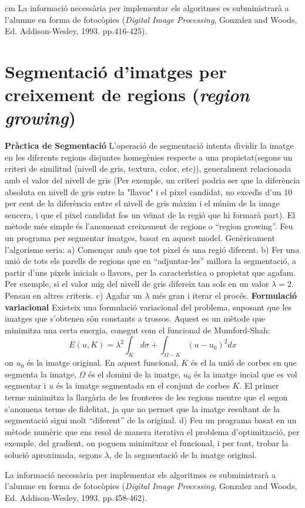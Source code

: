 \documentclass{article}
\begin{document}
 cm
La informaci\'o necess\`aria per implementar els algoritmes
es subministrar\`a a l'alumne en forma de fotoc\`opies 
({\it Digital Image Processing}, Gonzalez and Woods, Ed. Addison-Wesley, 1993. pp.416-425).

\section{Segmentaci\'o d'imatges per creixement de regions ({\it region growing})}
\noindent
{\bf Pr\`{a}ctica de Segmentaci\'{o}} L'operaci\'{o} de segmentaci\'{o} intenta dividir la imatge en les diferents
regions disjuntes homeg\`{e}nies respecte a una propietat(segons un criteri de similitud (nivell de
gris, textura, color, etc)), generalment relacionada amb el valor del nivell de gris (Per exemple,
un criteri podria ser que la difer\`{e}ncia absoluta en nivell de gris entre la "llavor" i el pixel
candidat, no exced\'{\i}s d'un 10 per cent de la difer\`{e}ncia entre el nivell de gris m\`{a}xim i el m\'{\i}nim de
la image sencera, i que el pixel candidat fos un ve\"{\i}nat de la regi\'{o} que hi formar\`{a} part). El m\`{e}tode
m\'{e}s simple \'{e}s l'anomenat creixement de regions o ``region growing''.  Feu un
programa per segmentar imatges, basat en aquest model. Gen\`{e}ricament l'algorisme seria:
\newline
a) Comen\c car amb que tot pixel \'{e}s una regi\'{o} diferent.
\newline
b) Fer una uni\'{o} de tots els parells de regions que en ``adjuntar-les'' millora la segmentaci\'{o}, a
partir d'uns pixels inicials o llavors, per la caracter\'{\i}stica o propietat que agafam. Per exemple,
si el valor mig del nivell de gris difereix tan sols en un valor $\lambda =2$. Pensau en altres
criteris.
\newline
c) Agafar un $\lambda$ m\'{e}s gran i iterar el proc\'{e}s.
\newline
{\bf  Formulaci\'{o} variacional} Existeix una formulaci\'{o} variacional del problema, suposant que les
imatges que s'obtenen s\'{o}n constants a trossos. Aquest es un m\`{e}tode que minimitza una certa energia,
conegut com el funcional de Mumford-Shah:
$$E(u,K)=\lambda^2 \int_{K} d\sigma + \int_{\Omega-K}(u-u_{0})^2dx$$
on $u_{0}$ \'{e}s la imatge original. En aquest funcional, $K$ \'{e}s el la uni\'{o} de corbes en que segmenta
la imatge, $\Omega$ \'{e}s el domini de la imatge, $u_{0}$ \'{e}s la imatge incial que es vol segmentar i
$u$ \'{e}s la imatge segmentada en el conjunt de corbes $K$.
 El primer terme minimitza la
llarg\`{a}ria de les fronteres de les regions mentre que el segon s'anomena terme de fidelitat, ja que
no permet que la imatge resultant de la segmentaci\'{o} sigui molt ``diferent'' de la original.
 d) Feu un programa basat en un m\`{e}tode num\`{e}ric que ens resol de manera iterativa
el problema d'optimitzaci\'{o}, per exemple, del gradient, on poguem minimitzar el funcional, i per
tant, trobar la soluci\'{o} aproximada, segons $\lambda$, de la segmentaci\'{o} de la imatge original.

\vskip 1.2cm
La informaci\'o necess\`aria per implementar els algoritmes
es subministrar\`a a l'alumne en forma de fotoc\`opies 
({\it Digital Image Processing}, Gonzalez and Woods, Ed. Addison-Wesley, 1993. pp.458-462).
\end{document}
